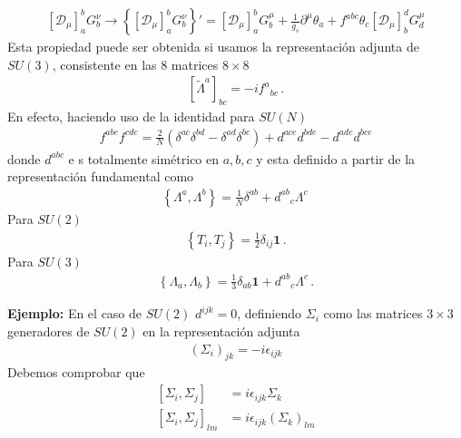 \begin{align}
    \left[ \mathcal{D}_{\mu} \right]_{a}^{b} G^{\nu}_{b}\to 
   \left\{   \left[ \mathcal{D}_{\mu} \right]_{a}^{b} G^{\nu}_{b}\right\}'=
\left[ \mathcal{D}_{\mu} \right]_{a}^{b} G^\mu_b+\frac{1}{g_s}\partial^\mu\theta_a
+f^{abc}\theta_c\left[ \mathcal{D}_{\mu} \right]_{b}^{d} G^\mu_d
\end{align}
Esta propiedad puede ser obtenida si usamos la representación adjunta de $SU(3)$, consistente en las 8 matrices $8\times 8$
\begin{align}
  \left[  \widetilde{\Lambda}^{a}\right]_{bc}=-i {f^{a}}_{bc}\,.
\end{align}
En efecto, haciendo uso de la identidad para $SU(N)$ \url{}
\begin{align}
  f^{abe}f^{cde}=\frac{2}{N}(\delta^{ac}\delta^{bd}-
 \delta^{ad}\delta^{bc})+d^{ace}d^{bde}-d^{ade}d^{bce}
\end{align}
donde $d^{abc}$ e
s totalmente simétrico en $a,b,c$ y esta definido a partir de la representación fundamental como
\begin{align}
  \left\{ \Lambda^{a},\Lambda^{b} \right\}=\frac{1}{N}\delta^{ab}+{d^{ab}}_c \Lambda^{c}\,
\end{align}Para  $SU(2)$
\begin{align}
\left\{T_i,T_j\right\}=\frac{1}{2}\delta_{ij}\mathbf{1}\,.
\end{align}
Para  $SU(3)$
\begin{align}
\left\{\Lambda_a,\Lambda_b\right\}=\frac{1}{3}\delta_{ab}\mathbf{1}+{d^{ab}}_c \Lambda^{c}\,.
\end{align}

\textbf{Ejemplo:}  En el caso de $SU(2)$ $d^{ijk}=0$, definiendo $\Sigma_i$ como las matrices $3\times3$ generadores de $SU(2)$ en la representaci\'on adjunta
\begin{align}
  (\Sigma_i)_{jk}=-i\epsilon_{ijk}
\end{align}
Debemos comprobar que
\begin{align}
  \left[{\Sigma_i},{\Sigma_j}\right]&=i\epsilon_{ijk}{\Sigma_k}\nonumber\\
  \left[{\Sigma_i},{\Sigma_j}\right]_{lm}&=i\epsilon_{ijk}(\Sigma_k)_{lm}
\end{align}

